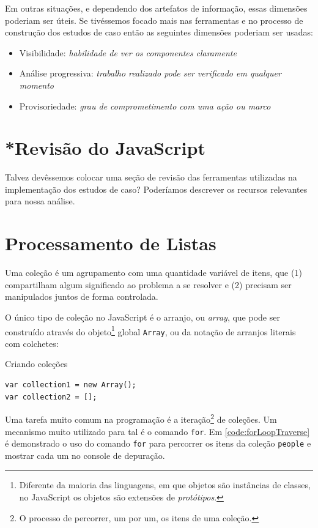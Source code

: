 Em outras situações, e dependendo dos artefatos de informação, essas dimensões
poderiam ser úteis. Se tivéssemos focado mais nas ferramentas e no processo de
construção dos estudos de caso então as seguintes dimensões poderiam ser usadas:

\begin{itemize}
\item Visibilidade: \emph{habilidade de ver os componentes claramente}
\item Análise progressiva: \emph{trabalho realizado pode ser verificado em qualquer
momento}
\item Provisoriedade: \emph{grau
de comprometimento com uma ação ou marco}
\end{itemize}


\section{*Revisão do JavaScript}
\label{sec:org393daf3}
Talvez devêssemos colocar uma seção de revisão das ferramentas utilizadas na
implementação dos estudos de caso? Poderíamos descrever os recursos relevantes
para nossa análise.


\section{Processamento de Listas}
\label{sec:org369cfb2}

Uma coleção é um agrupamento com uma quantidade variável de itens, que (1)
compartilham algum significado ao problema a se resolver e (2) precisam ser
manipulados juntos de forma controlada.

O único tipo de coleção no JavaScript é o arranjo, ou \emph{array}, que pode ser
construído através do objeto\footnote{Diferente da maioria das linguagens, em que objetos são
instâncias de classes, no JavaScript os objetos são extensões de \emph{protótipos}.} global \texttt{Array}, ou da
notação de arranjos literais com colchetes:

\begin{listing}[htbp]
\caption{Criando coleções}
\begin{verbatim}
var collection1 = new Array();
var collection2 = [];
\end{verbatim}
\end{listing}

Uma tarefa muito comum na programação é a iteração\footnote{O processo de percorrer, um por um, os itens de uma coleção.} de coleções.
Um mecanismo muito utilizado para tal é o comando \texttt{for}. Em
\ref{code:forLoopTraverse} é demonstrado o uso do comando \texttt{for} para
percorrer os itens da coleção \texttt{people} e mostrar cada um no console de
depuração.

